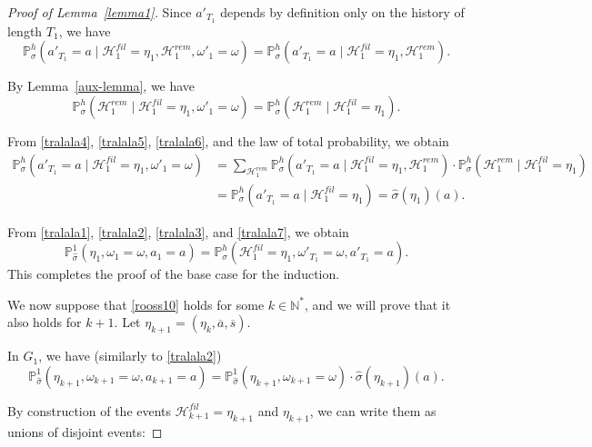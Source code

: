 \documentclass[english,openary,11pt]{article}
\theoremstyle{definition}
\newcommand{\N}{\mathbb{N}}
\renewcommand{\P}{\mathbb{P}}
\begin{document}
\begin{proof}[Proof of Lemma~\ref{lemma1}]
Since $a'_{T_{1}}$ depends by definition only on the history of length $T_{1}$, we have
\begin{equation}
\P_{\sigma}^h (a'_{T_1} = a \mid \mathcal H^{fil}_1 = \eta_1, \mathcal H^{rem}_1, \omega'_{1} = \omega) = \P_{\sigma}^h (a'_{T_1} = a \mid \mathcal H^{fil}_1 = \eta_1, \mathcal H^{rem}_1).
\label{tralala5}
\end{equation}


By Lemma~\ref{aux-lemma}, we have
\begin{equation}
\P_{\sigma}^h (\mathcal H^{rem}_1 \mid \mathcal H^{fil}_1 = \eta_1, \omega'_{1} = \omega) = \P_{\sigma}^h (\mathcal H^{rem}_1 \mid \mathcal H^{fil}_1 = \eta_1).
\label{tralala6}
\end{equation}

From \eqref{tralala4}, \eqref{tralala5}, \eqref{tralala6}, and the law of total probability, we obtain
\begin{equation}
\begin{aligned}
\P_{\sigma}^h (a'_{T_1} = a \mid \mathcal H^{fil}_1 = \eta_1, \omega'_{1} = \omega) 
&=
\sum_{\mathcal H^{rem}_1}
\P_{\sigma}^h (a'_{T_1} = a \mid \mathcal H^{fil}_1 = \eta_1, \mathcal H^{rem}_1) \cdot 
\P_{\sigma}^h (\mathcal H^{rem}_1 \mid \mathcal H^{fil}_1 = \eta_1) \\
&=
\P_{\sigma}^h (a'_{T_1} = a \mid \mathcal H^{fil}_1 = \eta_1)
=
\widehat \sigma(\eta_1)(a).
\end{aligned}
\label{tralala7}
\end{equation}

From \eqref{tralala1}, \eqref{tralala2}, \eqref{tralala3}, and \eqref{tralala7}, we obtain
$$\P_{\widehat \sigma}^1(\eta_1, \omega_1 = \omega, a_1 = a) = \P_{\sigma}^h(\mathcal H^{fil}_1 = \eta_1, \omega'_{T_1} = \omega, a'_{T_1} = a). $$
This completes the proof of the base case for the induction.

We now suppose that \eqref{rooss10} holds for some $k \in \N^*$, and we will prove that it also holds for $k+1$. Let $\eta_{k+1} = (\eta_k, \overline a, \overline s).$

In $G_1$, we have (similarly to \eqref{tralala2})
\begin{equation} 
\P_{\widehat \sigma}^1(\eta_{k+1}, \omega_{k+1} = \omega, a_{k+1} = a) = \P_{\widehat \sigma}^1(\eta_{k+1}, \omega_{k+1} = \omega) \cdot \widehat \sigma(\eta_{k+1})(a).
\label{roo10}
\end{equation}

By construction of the events $\mathcal H^{fil}_{k+1} = \eta_{k+1}$ and $\eta_{k+1}$, we can write them as unions of disjoint events:


\end{proof}
\end{document}
